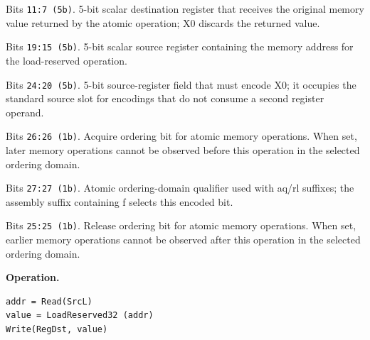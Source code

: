 \begin{description}[leftmargin=0.18\linewidth,style=nextline]
\item[\texttt{RegDst}] Bits \texttt{11:7 (5b)}. 5-bit scalar destination register that receives the original memory value returned by the atomic operation; X0 discards the returned value.
\item[\texttt{SrcL}] Bits \texttt{19:15 (5b)}. 5-bit scalar source register containing the memory address for the load-reserved operation.
\item[\texttt{SrcZero}] Bits \texttt{24:20 (5b)}. 5-bit source-register field that must encode X0; it occupies the standard source slot for encodings that do not consume a second register operand.
\item[\texttt{aq}] Bits \texttt{26:26 (1b)}. Acquire ordering bit for atomic memory operations. When set, later memory operations cannot be observed before this operation in the selected ordering domain.
\item[\texttt{far}] Bits \texttt{27:27 (1b)}. Atomic ordering-domain qualifier used with aq/rl suffixes; the assembly suffix containing f selects this encoded bit.
\item[\texttt{rl}] Bits \texttt{25:25 (1b)}. Release ordering bit for atomic memory operations. When set, earlier memory operations cannot be observed after this operation in the selected ordering domain.
\end{description}
\noindent\textbf{Operation.}\par
\begin{lstlisting}[style=ptoscalarcode]
addr = Read(SrcL)
value = LoadReserved32 (addr)
Write(RegDst, value)
\end{lstlisting}
\Needspace{0.08\textheight}
